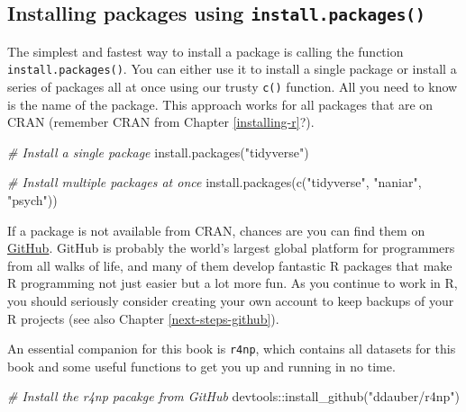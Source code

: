 \documentclass[
]{book}
\newenvironment{Shaded}{\begin{snugshade}}{\end{snugshade}}
\newcommand{\CommentTok}[1]{\textcolor[rgb]{0.56,0.35,0.01}{\textit{#1}}}
\newcommand{\FunctionTok}[1]{\textcolor[rgb]{0.00,0.00,0.00}{#1}}
\newcommand{\NormalTok}[1]{#1}
\newcommand{\SpecialCharTok}[1]{\textcolor[rgb]{0.00,0.00,0.00}{#1}}
\newcommand{\StringTok}[1]{\textcolor[rgb]{0.31,0.60,0.02}{#1}}
\begin{document}
\hypertarget{installing-packages-using-a-function}{%
\subsection{\texorpdfstring{Installing packages using \texttt{install.packages()}}{Installing packages using install.packages()}}\label{installing-packages-using-a-function}}

The simplest and fastest way to install a package is calling the function \texttt{install.packages()}. You can either use it to install a single package or install a series of packages all at once using our trusty \texttt{c()} function. All you need to know is the name of the package. This approach works for all packages that are on CRAN (remember CRAN from Chapter \ref{installing-r}?).

\begin{Shaded}
\begin{Highlighting}[]
\CommentTok{\# Install a single package}
\FunctionTok{install.packages}\NormalTok{(}\StringTok{"tidyverse"}\NormalTok{)}

\CommentTok{\# Install multiple packages at once}
\FunctionTok{install.packages}\NormalTok{(}\FunctionTok{c}\NormalTok{(}\StringTok{"tidyverse"}\NormalTok{, }\StringTok{"naniar"}\NormalTok{, }\StringTok{"psych"}\NormalTok{))}
\end{Highlighting}
\end{Shaded}

If a package is not available from CRAN, chances are you can find them on \href{https://github.com}{GitHub}. GitHub is probably the world's largest global platform for programmers from all walks of life, and many of them develop fantastic R packages that make R programming not just easier but a lot more fun. As you continue to work in R, you should seriously consider creating your own account to keep backups of your R projects (see also Chapter \ref{next-steps-github}).

An essential companion for this book is \texttt{r4np}, which contains all datasets for this book and some useful functions to get you up and running in no time.

\begin{Shaded}
\begin{Highlighting}[]
\CommentTok{\# Install the \textquotesingle{}r4np\textquotesingle{} pacakge from GitHub}
\NormalTok{devtools}\SpecialCharTok{::}\FunctionTok{install\_github}\NormalTok{(}\StringTok{"ddauber/r4np"}\NormalTok{)}
\end{Highlighting}
\end{Shaded}
\end{document}
